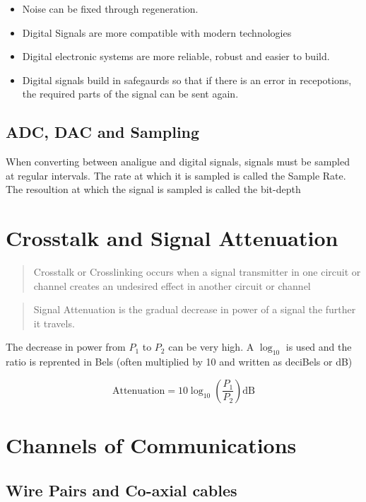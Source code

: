 \documentclass{scrbook}
\begin{document}
	\begin{itemize}
		\item
			Noise can be fixed through regeneration.
		\item
			Digital Signals are more compatible with modern technologies
		\item
			Digital electronic systems are more reliable, robust and easier to build.
		\item
			Digital signals build in safegaurds so that if there is an error in recepotions, the required parts of the signal can be sent again.
	\end{itemize}

\subsection{ADC, DAC and Sampling}

	When converting between analigue and digital signals, signals must be sampled at regular intervals. The rate at which it is sampled is called the Sample Rate. The resoultion at which the signal is sampled is called the bit-depth


\section{Crosstalk and Signal Attenuation}

	\begin{quote}
		Crosstalk or Crosslinking occurs when a signal transmitter in one circuit or channel creates an undesired effect in another circuit or channel
	\end{quote}

	\begin{quote}
		Signal Attenuation is the gradual decrease in power of a signal the further it travels.
	\end{quote}

	The decrease in power from $P_1$ to $P_2$ can be very high. A $\log_{10}$ is used and the ratio is reprented in Bels (often multiplied by 10 and written as deciBels or dB)

	\[ \text{Attenuation}  = 10\log_{10}\left(\frac{P_1}{P_2}  \right) \text{dB}\]

\section{Channels of Communications}

\subsection{Wire Pairs and Co-axial cables}
\end{document}
